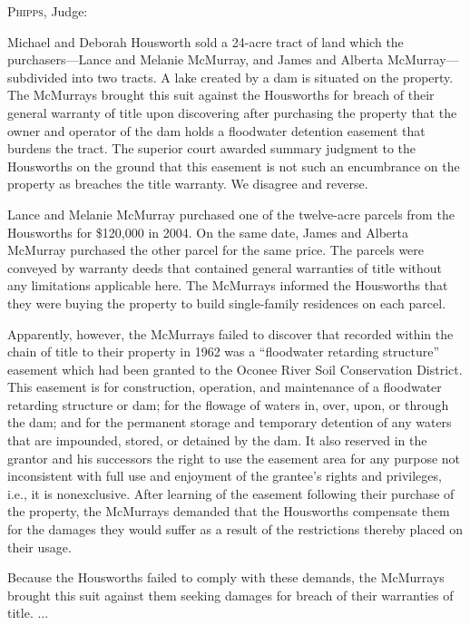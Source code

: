 

\opinion \textsc{Phipps}, Judge: 

Michael and Deborah Housworth sold a 24-acre tract of land which the
purchasers---Lance and Melanie McMurray, and James and Alberta McMurray---
subdivided into two tracts. A lake created by a dam is situated on the
property. The McMurrays brought this suit against the Housworths for breach of
their general warranty of title upon discovering after purchasing the property
that the owner and operator of the dam holds a floodwater detention easement
that burdens the tract. The superior court awarded summary judgment to the
Housworths on the ground that this easement is not such an encumbrance on the
property as breaches the title warranty. We disagree and reverse. 

Lance and Melanie McMurray purchased one of the twelve-acre parcels from the
Housworths for \$120,000 in 2004. On the same date, James and Alberta McMurray
purchased the other parcel for the same price. The parcels were conveyed by
warranty deeds that contained general warranties of title without any
limitations applicable here. The McMurrays informed the Housworths that they
were buying the property to build single-family residences on each parcel. 

Apparently, however, the McMurrays failed to discover that recorded within the
chain of title to their property in 1962 was a ``floodwater retarding
structure'' easement which had been granted to the Oconee River Soil
Conservation District. This easement is for construction, operation, and
maintenance of a floodwater retarding structure or dam; for the flowage of
waters in, over, upon, or through the dam; and for the permanent storage and
temporary detention of any waters that are impounded, stored, or detained by
the dam. It also reserved in the grantor and his successors the right to use
the easement area for any purpose not inconsistent with full use and enjoyment
of the grantee's rights and privileges, i.e., it is nonexclusive. After
learning of the easement following their purchase of the property, the
McMurrays demanded that the Housworths compensate them for the damages they
would suffer as a result of the restrictions thereby placed on their usage. 

Because the Housworths failed to comply with these demands, the McMurrays
brought this suit against them seeking damages for breach of their warranties
of title. ... 


